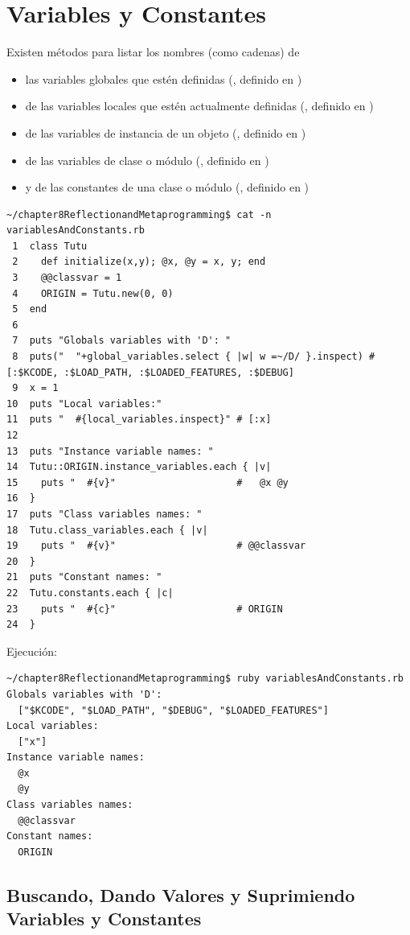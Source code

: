 \section{Variables y Constantes}

Existen métodos para listar los nombres (como cadenas)
de 
\begin{itemize}
\item las variables globales que estén definidas (, definido en \Kernel{}) 
\item de las variables locales que estén actualmente definidas (, definido en \Kernel{})
\item de las variables de instancia de un objeto (, definido en \Object{})
\item de las variables de clase o módulo (, definido en \Class{})
\item y de las constantes de una clase o módulo (, definido en \Module{})
\end{itemize}

\begin{verbatim}
~/chapter8ReflectionandMetaprogramming$ cat -n variablesAndConstants.rb 
 1  class Tutu
 2    def initialize(x,y); @x, @y = x, y; end
 3    @@classvar = 1
 4    ORIGIN = Tutu.new(0, 0)
 5  end
 6  
 7  puts "Globals variables with 'D': "
 8  puts("  "+global_variables.select { |w| w =~/D/ }.inspect) #  [:$KCODE, :$LOAD_PATH, :$LOADED_FEATURES, :$DEBUG]
 9  x = 1
10  puts "Local variables:"
11  puts "  #{local_variables.inspect}" # [:x]
12  
13  puts "Instance variable names: "
14  Tutu::ORIGIN.instance_variables.each { |v|
15    puts "  #{v}"                     #   @x @y
16  }
17  puts "Class variables names: "
18  Tutu.class_variables.each { |v|
19    puts "  #{v}"                     # @@classvar
20  }
21  puts "Constant names: "
22  Tutu.constants.each { |c|
23    puts "  #{c}"                     # ORIGIN
24  }
\end{verbatim}
Ejecución:
\begin{verbatim}
~/chapter8ReflectionandMetaprogramming$ ruby variablesAndConstants.rb 
Globals variables with 'D': 
  ["$KCODE", "$LOAD_PATH", "$DEBUG", "$LOADED_FEATURES"]
Local variables:
  ["x"]
Instance variable names: 
  @x
  @y
Class variables names: 
  @@classvar
Constant names: 
  ORIGIN
\end{verbatim}

\subsection{Buscando, Dando Valores y Suprimiendo Variables y Constantes}

